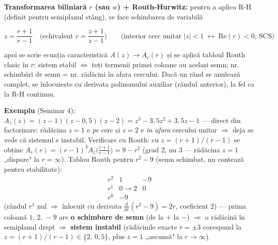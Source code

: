 \documentclass[10pt,a4paper]{article}
\begin{document}
\textbf{Transformarea biliniară $r$ (sau $w$) + Routh-Hurwitz:} pentru a aplica R-H (definit pentru semiplanul stâng), se face schimbarea de variabilă
\begin{keyeq}\color{red!65!black}
$$z=\dfrac{r+1}{r-1}\quad\Big(\text{echivalent } r=\dfrac{z+1}{z-1}\Big)\qquad\text{(interior cerc unitar }|z|{<}1\;\longleftrightarrow\; \mathrm{Re}(r)<0\text{, SCS)}$$
\end{keyeq}
apoi se scrie ecuația caracteristică $A(z)\to A_r(r)$ și se aplică tabloul Routh clasic în $r$: sistem stabil $\iff$ toți termenii primei coloane au același semn; nr. schimbări de semn = nr. rădăcini în afara cercului. Dacă un rând se anulează complet, se înlocuiește cu derivata polinomului auxiliar (rândul anterior), la fel ca la R-H continuu.

\textbf{Exemplu} (Seminar 4): $A_z(z)=(z-1)(z-0{,}5)(z-2)=z^3-3{,}5z^2+3{,}5z-1$ — direct din factorizare: rădăcina $z=1$ e \emph{pe} cerc și $z=2$ e \emph{în afara} cercului unitar $\Rightarrow$ deja se vede că sistemul e instabil. Verificare cu Routh: cu $z=(r+1)/(r-1)$ se obține $A_r(r)=(r-1)^3A_z\big(\tfrac{r+1}{r-1}\big)=9-r^2$ (grad 2, nu 3 — rădăcina $z{=}1$ „dispare" la $r=\infty$). Tablou Routh pentru $r^2-9$ (semn schimbat, nu contează pentru stabilitate):
$$\begin{array}{c|cc} r^2 & 1 & -9\\ r^1 & 0\to2 & 0\\ r^0 & -9 & \end{array}$$
(rândul $r^1$ nul $\Rightarrow$ înlocuit cu derivata $\tfrac{d}{dr}(r^2-9)=2r$, coeficient $2$) — prima coloană $1,\,2,\,-9$ are \textbf{o schimbare de semn} (de la $+$ la $-$) $\Rightarrow$ o rădăcină în semiplanul drept $\Rightarrow$ \textbf{sistem instabil} (rădăcinile exacte $r=\pm3$ corespund la $z=(r{+}1)/(r{-}1)\in\{2,\,0{,}5\}$, plus $z=1$ „ascunsă" la $r\to\infty$).
\end{document}
